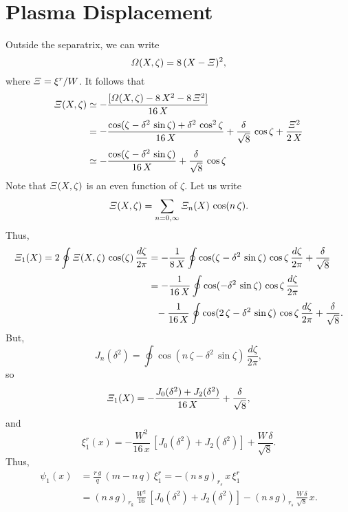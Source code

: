 \documentclass[12pt,prb,aps,notitlepage]{revtex4-1}
\begin{document}
\section{Plasma Displacement}
Outside the separatrix, we can write
\begin{equation}
{\mit\Omega}(X,\zeta) = 8\,(X-{\mit\Xi})^2,
\end{equation}
where ${\mit\Xi}= \xi^r/W$. It follows that
\begin{align}
{\mit\Xi}(X,\zeta)&\simeq -\frac{[{\mit\Omega}(X,\zeta)-8\,X^2 - 8\,{\mit\Xi}^2]}{16\,X}\nonumber\\[0.5ex]
&=- \frac{\cos(\zeta-\delta^2\,\sin\zeta) +\delta^2\,\cos^2\zeta}{16\,X}+\frac{\delta}{\sqrt{8}}\,\cos\zeta + \frac{{\mit\Xi}^2}{2\,X}\nonumber\\[0.5ex]
&\simeq - \frac{\cos(\zeta-\delta^2\,\sin\zeta)}{16\,X}+\frac{\delta}{\sqrt{8}}\,\cos\zeta 
\end{align}
Note that ${\mit\Xi}(X,\zeta)$ is an even function of $\zeta$. 
Let us write
\begin{equation}
{\mit\Xi}(X,\zeta)= \sum_{n=0,\infty} {\mit\Xi}_n(X)\,\cos(n\,\zeta).
\end{equation}
Thus,
\begin{align}
{\mit\Xi}_1(X) =2 \oint {\mit\Xi}(X,\zeta)\,\cos(\zeta)\,\frac{d\zeta}{2\pi} &= -\frac{1}{8\,X}\oint\cos(\zeta-\delta^2\,\sin\zeta)\,\cos\zeta\,\frac{d\zeta}{2\pi}+\frac{\delta}{\sqrt{8}}\nonumber \\[0.5ex]
&=-\frac{1}{16\,X}\oint\cos(-\delta^2\,\sin\zeta)\,\cos\zeta\,\frac{d\zeta}{2\pi}\nonumber\\[0.5ex]
&\phantom{=}- \frac{1}{16\,X}\oint\cos(2\,\zeta-\delta^2\,\sin\zeta)\,\cos\zeta\,\frac{d\zeta}{2\pi}+\frac{\delta}{\sqrt{8}} .
\end{align}
But,
\begin{equation}
J_n(\delta^2) = \oint\cos(n\,\zeta-\delta^2\,\sin\zeta)\,\frac{d\zeta}{2\pi},
\end{equation}
so
\begin{equation}
{\mit\Xi}_1(X) =- \frac{J_0(\delta^2) + J_2(\delta^2)}{16\,X}+ \frac{\delta}{\sqrt{8}} ,
\end{equation}
and
\begin{equation}
\xi^r_1(x) =- \frac{W^2}{16\,x}\,[J_0(\delta^2)+ J_2(\delta^2)]+ \frac{W\,\delta}{\sqrt{8}} .
\end{equation}
Thus,
\begin{align}
\psi_1(x) &= \frac{r\,g}{q}\,(m-n\,q)\,\xi_1^r = -(n\,s\,g)_{r_s}\,x\,\xi_1^r\nonumber\\[0.5ex]
&= (n\,s\,g)_{r_k}\,\frac{W^2}{16}\,[J_0(\delta^2)+ J_2(\delta^2)] - (n\,s\,g)_{r_s}\,\frac{W\,\delta}{\sqrt{8}}\,x.
\end{align}
\end{document}
